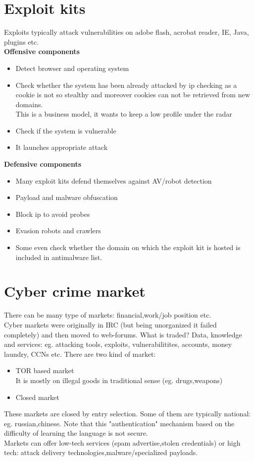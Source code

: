 \documentclass[10pt,a4paper]{book}
\begin{document}
\section{Exploit kits}
Exploits typically attack vulnerabilities on adobe flash, acrobat reader, IE, Java, plugins etc.\\
\textbf{Offensive components}
\begin{itemize}
\item Detect browser and operating system
\item Check whether the system has been already attacked by ip checking as a cookie is not so stealthy and moreover cookies can not be retrieved from new domains.\\ This is a business model, it wants to keep a low profile under the radar
\item Check if the system is vulnerable
\item It launches appropriate attack
\end{itemize}
\textbf{Defensive components}
\begin{itemize}
\item Many exploit kits defend themselves against AV/robot detection
\item Payload and malware obfuscation
\item Block ip to avoid probes
\item Evasion robots and crawlers
\item Some even check whether the domain on which the exploit kit is hosted is included in antimalware list.
\end{itemize}
\section{Cyber crime market}
There can be many type of markets: financial,work/job position etc. \\
Cyber markets were originally in IRC (but being unorganized it failed completely) and then moved to web-forums. What is traded? Data, knowledge and services: eg. attacking tools, exploits, vulnerabilitites, accounts, money laundry, CCNs etc.
There are two kind of market:
\begin{itemize}
\item TOR based market\\
It is mostly on illegal goods in traditional sense (eg. drugs,weapons)
\item Closed market
\end{itemize}
These markets are closed by entry selection. Some of them are typically national: eg. russian,chinese. Note that this "authentication" mechanism based on the difficulty of learning the language is not secure.\\
Markets can offer low-tech services (spam advertise,stolen credentials) or high tech: attack delivery technologies,malware/specialized payloads.
\end{document}
